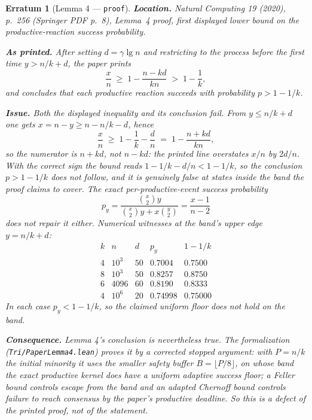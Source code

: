 \documentclass[11pt]{article}
\theoremstyle{erratumstyle}
\newtheorem{erratum}{Erratum}
\begin{document}
\begin{erratum}[Lemma 4 --- \texttt{proof}]
\textbf{Location.} \emph{Natural Computing} 19 (2020), p.~256
(Springer PDF p.~8), Lemma~4 proof, first displayed lower bound on the
productive-reaction success probability.

\medskip
\textbf{As printed.} After setting $d=\gamma\lg n$ and restricting to the
process before the first time $y>n/k+d$, the paper prints
\[
  \frac{x}{n}\;\ge\;1-\frac{n-kd}{kn}\;>\;1-\frac1k ,
\]
and concludes that each productive reaction succeeds with probability
$p>1-1/k$.

\medskip
\textbf{Issue.} Both the displayed inequality and its conclusion fail. From
$y\le n/k+d$ one gets $x=n-y\ge n-n/k-d$, hence
\[
  \frac xn\;\ge\;1-\frac1k-\frac dn\;=\;1-\frac{n+kd}{kn},
\]
so the numerator is $n+kd$, not $n-kd$: the printed line overstates $x/n$ by
$2d/n$. With the correct sign the bound reads $1-1/k-d/n<1-1/k$, so the
conclusion $p>1-1/k$ does not follow, and it is genuinely false at states
inside the band the proof claims to cover. The exact per-productive-event
success probability
\[
  p_y=\frac{\binom x2 y}{\binom x2 y+x\binom y2}=\frac{x-1}{n-2}
\]
does not repair it either. Numerical witnesses at the band's upper edge
$y=n/k+d$:
\[
  \begin{array}{c|c|c|c|c}
    k & n & d & p_y & 1-1/k\\\hline
    4 & 10^3 & 50 & 0.7004 & 0.7500\\
    8 & 10^3 & 50 & 0.8257 & 0.8750\\
    6 & 4096 & 60 & 0.8190 & 0.8333\\
    4 & 10^6 & 20 & 0.74998 & 0.75000
  \end{array}
\]
In each case $p_y<1-1/k$, so the claimed uniform floor does not hold on the
band.

\medskip
\textbf{Consequence.} Lemma 4's conclusion is nevertheless true. The
formalization (\texttt{Tri/PaperLemma4.lean}) proves it by a corrected
stopped argument: with $P=n/k$ the initial minority it uses the smaller safety
buffer $B=\lfloor P/8\rfloor$, on whose band the exact productive kernel does
have a uniform adaptive success floor; a Feller bound controls escape from the
band and an adapted Chernoff bound controls failure to reach consensus by the
paper's productive deadline. So this is a defect of the printed proof, not of
the statement.
\end{erratum}
\end{document}
